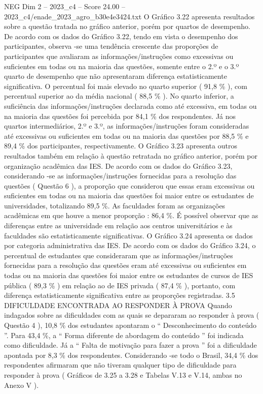 \begin{textsample}{NEG Dim 2 – 2023\_c4 – Score 24.00 – 2023\_c4/enade\_2023\_agro\_b30e4e3424.txt}
O Gráfico 3.22 apresenta resultados sobre a questão tratada no gráfico anterior, porém por quartos de desempenho.
De acordo com os dados do Gráfico 3.22, tendo em vista o desempenho dos participantes, observa -se uma tendência crescente das proporções de participantes que avaliaram as informações/instruções como excessivas ou suficientes em todas ou na maioria das questões, somente entre o 2.º e o 3.º quarto de desempenho que não apresentaram diferença estatisticamente significativa.
O percentual foi mais elevado no quarto superior ( 91,8 \% ), com percentual superior ao da média nacional ( 88,5 \% ).
No quarto inferior, a suficiência das informações/instruções declarada como até excessiva, em todas ou na maioria das questões foi percebida por 84,1 \% dos respondentes.
Já nos quartos intermediários, 2.º e 3.º, as informações/instruções foram consideradas até excessivas ou suficientes em todas ou na maioria das questões por 88,5 \% e 89,4 \% dos participantes, respectivamente.
O Gráfico 3.23 apresenta outros resultados também em relação à questão retratada no gráfico anterior, porém por organização acadêmica das IES.
De acordo com os dados do Gráfico 3.23, considerando -se as informações/instruções fornecidas para a resolução das questões ( Questão 6 ), a proporção que considerou que essas eram excessivas ou suficientes em todas ou na maioria das questões foi maior entre os estudantes de universidades, totalizando 89,5 \%.
As faculdades foram as organizações acadêmicas em que houve a menor proporção : 86,4 \%.
É possível observar que as diferenças entre as universidade em relação aos centros universitários e às faculdades são estatisticamente significativas.
O Gráfico 3.24 apresenta os dados por categoria administrativa das IES.
De acordo com os dados do Gráfico 3.24, o percentual de estudantes que consideraram que as informações/instruções fornecidas para a resolução das questões eram até excessivas ou suficientes em todas ou na maioria das questões foi maior entre os estudantes de cursos de IES pública ( 89,3 \% ) em relação ao de IES privada ( 87,4 \% ), portanto, com diferença estatisticamente significativa entre as proporções registradas. 3.5 DIFICULDADE ENCONTRADA AO RESPONDER À PROVA Quando indagados sobre as dificuldades com as quais se depararam ao responder à prova ( Questão 4 ), 10,8 \% dos estudantes apontaram o “ Desconhecimento do conteúdo ”.
Para 43,4 \%, a “ Forma diferente de abordagem do conteúdo ” foi indicada como dificuldade.
Já a “ Falta de motivação para fazer a prova ” foi a dificuldade apontada por 8,3 \% dos respondentes.
Considerando -se todo o Brasil, 34,4 \% dos respondentes afirmaram que não tiveram qualquer tipo de dificuldade para responder à prova ( Gráficos de 3.25 a 3.28 e Tabelas V.13 e V.14, ambas no Anexo V ).

\end{textsample}
